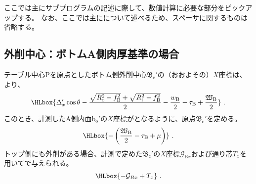 

ここでは主にサブプログラムの記述に際して、数値計算に必要な部分をピックアップする。
なお、ここでは主に\DMname について述べるため、スペーサに関するものは省略する。





\subsection{外削中心：ボトムA側肉厚基準の場合}
テーブル中心Pを原点としたボトム側外削中心$\mathfrak B_\mathrm c'$の（おおよその）$X$座標は、より、
\begin{align*}
  \HLbox{%
    \Delta_x'\cos\theta
    -\frac{\sqrt{R_\mathrm o^2-f_\mathrm B^2}+\sqrt{R_\mathrm i^2-f_\mathrm B^2}}2
    -\frac{w_\mathrm B}2
    -\tau_\mathrm B
    +\frac{\mathfrak W_\mathrm B}2
  }\ .
\end{align*}
このとき、計測したA側内面b$_\mathrm o'$の$X$座標がとなるように、原点$\mathfrak B_\mathrm c'$を定める。
\begin{align*}
  \HLbox{-\left(\frac{\mathfrak W_\mathrm B}2-\tau_\mathrm B+\mu\right)}\ .
\end{align*}
トップ側にも外削がある場合、計測で定めた$\mathfrak B_\mathrm c'$の$X$座標$\mathcal G_{\mathrm Bx}$および通り芯$T_x$を用いてで与えられる。
\begin{align*}
  \HLbox{-\mathcal G_{Bx}+T_x}\ .
\end{align*}



